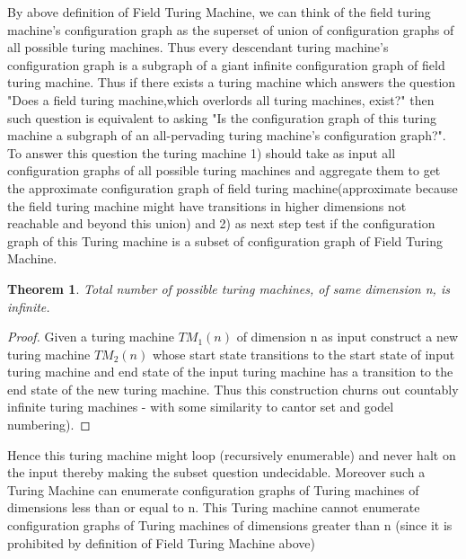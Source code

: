 \documentclass[11pt,onecolumn]{article}
\newtheorem{theorem}{Theorem}
\begin{document}
By above definition of Field Turing Machine, we can think of the field turing machine's configuration graph as the superset of union of configuration graphs of all possible turing machines. Thus every descendant turing machine's configuration graph is a subgraph of a giant infinite configuration graph of field turing machine. Thus if there exists a turing machine which answers the question "Does a field turing machine,which overlords all turing machines, exist?" then such question is equivalent to asking "Is the configuration graph of this turing machine a subgraph of an all-pervading turing machine's configuration graph?". To answer this question the turing machine 1) should take as input all configuration graphs of all possible turing machines and aggregate them to get the approximate configuration graph of field turing machine(approximate because the field turing machine might have transitions in higher dimensions not reachable and beyond this union) and 2) as next step test if the configuration graph of this Turing machine is a subset of configuration graph of Field Turing Machine. 
\begin{theorem}
Total number of possible turing machines, of same dimension n, is infinite.
\end{theorem}
\begin{proof}
Given a turing machine $TM_{1}(n)$ of  dimension n as input construct a new turing machine $TM_{2}(n)$ whose start state transitions to the start state of input turing machine and end state of  the input turing machine has a transition to the end state of the new turing machine. Thus this construction churns out countably infinite turing machines - with some similarity to cantor set and godel numbering).  
\end{proof}
Hence this turing machine might loop (recursively enumerable) and never halt on the input thereby making the subset question undecidable. Moreover such a Turing Machine can enumerate configuration graphs of Turing machines of dimensions less than or equal to n. This Turing machine cannot enumerate configuration graphs of Turing machines of dimensions greater than n (since it is prohibited by definition of Field Turing Machine above)
\end{document}
